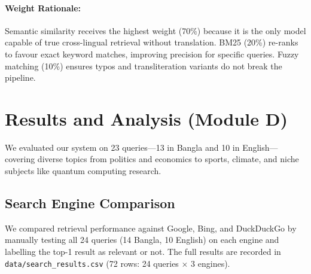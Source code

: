 \documentclass[12pt,a4paper]{article}
\begin{document}
\paragraph{Weight Rationale:} Semantic similarity receives the highest weight (70\%) because it is the only model capable of true cross-lingual retrieval without translation. BM25 (20\%) re-ranks to favour exact keyword matches, improving precision for specific queries. Fuzzy matching (10\%) ensures typos and transliteration variants do not break the pipeline.

\section{Results and Analysis (Module D)}

We evaluated our system on 23 queries---13 in Bangla and 10 in English---covering diverse topics from politics and economics to sports, climate, and niche subjects like quantum computing research.

\subsection{Search Engine Comparison}

We compared retrieval performance against Google, Bing, and DuckDuckGo by manually testing all 24 queries (14 Bangla, 10 English) on each engine and labelling the top-1 result as relevant or not. The full results are recorded in \texttt{data/search\_results.csv} (72 rows: 24 queries $\times$ 3 engines).
\end{document}
